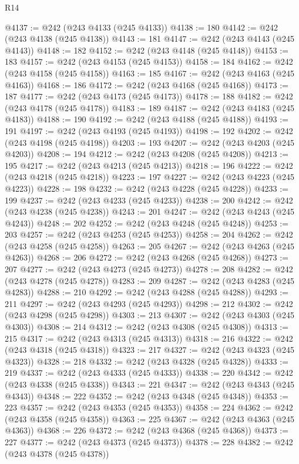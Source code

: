 \begin{lexlean}{R14}
\begin{coremodule}
@4137 := @242 (@243 @4133 (@245 @4133))
@4138 := 180
@4142 := @242 (@243 @4138 (@245 @4138))
@4143 := 181
@4147 := @242 (@243 @4143 (@245 @4143))
@4148 := 182
@4152 := @242 (@243 @4148 (@245 @4148))
@4153 := 183
@4157 := @242 (@243 @4153 (@245 @4153))
@4158 := 184
@4162 := @242 (@243 @4158 (@245 @4158))
@4163 := 185
@4167 := @242 (@243 @4163 (@245 @4163))
@4168 := 186
@4172 := @242 (@243 @4168 (@245 @4168))
@4173 := 187
@4177 := @242 (@243 @4173 (@245 @4173))
@4178 := 188
@4182 := @242 (@243 @4178 (@245 @4178))
@4183 := 189
@4187 := @242 (@243 @4183 (@245 @4183))
@4188 := 190
@4192 := @242 (@243 @4188 (@245 @4188))
@4193 := 191
@4197 := @242 (@243 @4193 (@245 @4193))
@4198 := 192
@4202 := @242 (@243 @4198 (@245 @4198))
@4203 := 193
@4207 := @242 (@243 @4203 (@245 @4203))
@4208 := 194
@4212 := @242 (@243 @4208 (@245 @4208))
@4213 := 195
@4217 := @242 (@243 @4213 (@245 @4213))
@4218 := 196
@4222 := @242 (@243 @4218 (@245 @4218))
@4223 := 197
@4227 := @242 (@243 @4223 (@245 @4223))
@4228 := 198
@4232 := @242 (@243 @4228 (@245 @4228))
@4233 := 199
@4237 := @242 (@243 @4233 (@245 @4233))
@4238 := 200
@4242 := @242 (@243 @4238 (@245 @4238))
@4243 := 201
@4247 := @242 (@243 @4243 (@245 @4243))
@4248 := 202
@4252 := @242 (@243 @4248 (@245 @4248))
@4253 := 203
@4257 := @242 (@243 @4253 (@245 @4253))
@4258 := 204
@4262 := @242 (@243 @4258 (@245 @4258))
@4263 := 205
@4267 := @242 (@243 @4263 (@245 @4263))
@4268 := 206
@4272 := @242 (@243 @4268 (@245 @4268))
@4273 := 207
@4277 := @242 (@243 @4273 (@245 @4273))
@4278 := 208
@4282 := @242 (@243 @4278 (@245 @4278))
@4283 := 209
@4287 := @242 (@243 @4283 (@245 @4283))
@4288 := 210
@4292 := @242 (@243 @4288 (@245 @4288))
@4293 := 211
@4297 := @242 (@243 @4293 (@245 @4293))
@4298 := 212
@4302 := @242 (@243 @4298 (@245 @4298))
@4303 := 213
@4307 := @242 (@243 @4303 (@245 @4303))
@4308 := 214
@4312 := @242 (@243 @4308 (@245 @4308))
@4313 := 215
@4317 := @242 (@243 @4313 (@245 @4313))
@4318 := 216
@4322 := @242 (@243 @4318 (@245 @4318))
@4323 := 217
@4327 := @242 (@243 @4323 (@245 @4323))
@4328 := 218
@4332 := @242 (@243 @4328 (@245 @4328))
@4333 := 219
@4337 := @242 (@243 @4333 (@245 @4333))
@4338 := 220
@4342 := @242 (@243 @4338 (@245 @4338))
@4343 := 221
@4347 := @242 (@243 @4343 (@245 @4343))
@4348 := 222
@4352 := @242 (@243 @4348 (@245 @4348))
@4353 := 223
@4357 := @242 (@243 @4353 (@245 @4353))
@4358 := 224
@4362 := @242 (@243 @4358 (@245 @4358))
@4363 := 225
@4367 := @242 (@243 @4363 (@245 @4363))
@4368 := 226
@4372 := @242 (@243 @4368 (@245 @4368))
@4373 := 227
@4377 := @242 (@243 @4373 (@245 @4373))
@4378 := 228
@4382 := @242 (@243 @4378 (@245 @4378))

\end{coremodule}
\end{lexlean}
